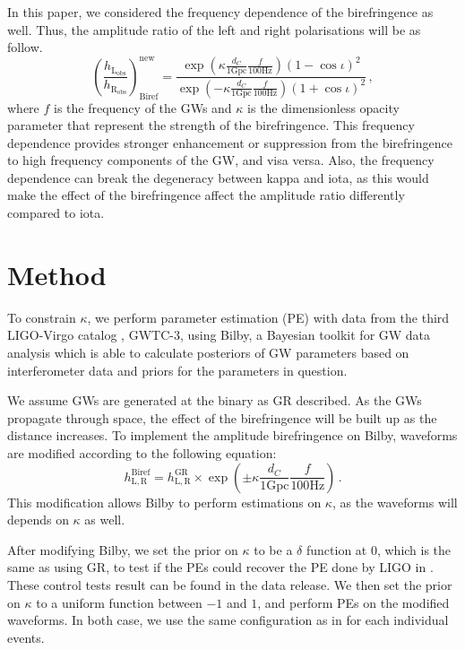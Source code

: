 \documentclass[twocolumn]{aastex631}
\begin{document}
In this paper, we considered the frequency dependence of the birefringence as well.
Thus, the amplitude ratio of the left and right polarisations will be as follow.
\begin{equation}
    \left(\frac{h_\mathrm{L_{obs}}}{h_\mathrm{R_{obs}}}\right)_\mathrm{Biref}^\mathrm{new}=\frac{\exp\left({\kappa\frac{d_C}{1\mathrm{ Gpc}}\frac{f}{100\mathrm{ Hz}}}\right)\left(1-\cos\iota\right)^2}{\exp\left({-\kappa\frac{d_C}{1\mathrm{Gpc}}\frac{f}{100\mathrm{Hz}}}\right)\left(1+\cos\iota\right)^2}\,,
\end{equation}where $f$ is the frequency of the GWs and $\kappa$ is the dimensionless opacity parameter that represent the strength of the birefringence.
This frequency dependence provides stronger enhancement or suppression from the birefringence to high frequency components of the GW, and visa versa.
Also, the frequency dependence can break the degeneracy between kappa and iota,
as this would make the effect of the birefringence affect the amplitude ratio differently compared to iota.

\section{Method}

To constrain $\kappa$, we perform parameter estimation (PE) with data from the third LIGO-Virgo catalog \citep{GWTC-2.1, GWTC-3}, GWTC-3, using Bilby,
a Bayesian toolkit for GW data analysis which is able to calculate posteriors of GW parameters based on interferometer data
and priors for the parameters in question. \citep{Bilby}

We assume GWs are generated at the binary as GR described. As the GWs propagate through space,
the effect of the birefringence will be built up as the distance increases.
To implement the amplitude birefringence on Bilby, waveforms are modified according to the following equation:
\begin{equation}
    h_\mathrm{L,R}^{\mathrm{Biref}}=
    h_\mathrm{L,R}^{\mathrm{GR}}\times
    \exp\left(\pm\kappa\frac{d_C}{1\mathrm{ Gpc}}\frac{f}{100\mathrm{ Hz}}\right)\,.
\end{equation}
This modification allows Bilby to perform estimations on $\kappa$, as the waveforms will depends on $\kappa$ as well.

After modifying Bilby, we set the prior on $\kappa$ to be a $\delta$ function at $0$, which is the same as using GR,
to test if the PEs could recover the PE done by LIGO in \citet{GWTC-2.1, GWTC-3}. These control tests result can be found in the data release.
We then set the prior on $\kappa$ to a uniform function between $-1$ and $1$, and perform PEs on the modified waveforms.
In both case, we use the same configuration as in \citep{GWTC-2.1, GWTC-3} for each individual events.
\end{document}
